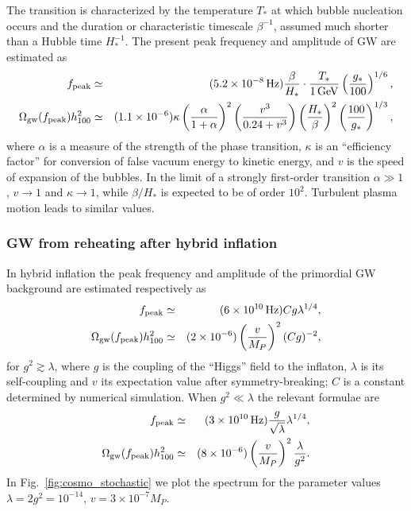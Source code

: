 The transition is characterized by the temperature $T_\ast$ at which bubble nucleation occurs and the duration or characteristic timescale $\beta^{-1}$, assumed much shorter than a Hubble time $H_\ast^{-1}$. The present peak frequency and amplitude of GW are estimated as \cite{Kamionkowski:1993fg}
\begin{eqnarray}
	f_{\rm peak} &\simeq& (5.2\times 10^{-8}\,{\rm Hz}) \frac{\beta}{H_\ast}\cdot \frac{T_\ast}{1\,{\rm GeV}}
	\left(\frac{g_\ast}{100}\right)^{1/6}, \nonumber \\
	\Omega_{\rm gw}(f_{\rm peak})h_{100}^2 &\simeq& (1.1\times 10^{-6}) \kappa
	\left(\frac{\alpha}{1+\alpha}\right)^2 \left(\frac{v^3}{0.24+v^3}\right) \left(\frac{H_\ast}{\beta}\right)^2
	\left(\frac{100}{g_\ast}\right)^{1/3},
\end{eqnarray}
where $\alpha$ is a measure of the strength of the phase transition, $\kappa$ is an ``efficiency factor'' for conversion of false vacuum energy to kinetic energy, and $v$ is the speed of expansion of the bubbles. In the limit of a strongly first-order transition $\alpha\gg 1$, $v\rightarrow 1$ and $\kappa \rightarrow 1$, while $\beta/H_\ast$ is expected to be of order $10^2$. Turbulent plasma motion leads to similar values.

\subsubsection{GW from reheating after hybrid inflation}
\label{box:hybridinf}

In hybrid inflation the peak frequency and amplitude of the primordial GW background are estimated respectively as
\begin{eqnarray}
	f_{\rm peak} &\simeq& (6\times 10^{10}\,{\rm Hz}) C g \lambda^{1/4}, \nonumber \\
	\Omega_{\rm gw}(f_{\rm peak})h_{100}^2 &\simeq& (2\times 10^{-6}) \left(\frac{v}{M_{P}}\right)^2 (Cg)^{-2},
\end{eqnarray}
for $g^2 \gtrsim \lambda$, where $g$ is the coupling of the ``Higgs'' field to the inflaton, $\lambda$ is its self-coupling and $v$ its expectation value after symmetry-breaking; $C$ is a constant determined by numerical simulation. When $g^2 \ll \lambda$ the relevant formulae are
\begin{eqnarray}
	f_{\rm peak} &\simeq& (3\times 10^{10}\,{\rm Hz}) \frac{g}{\sqrt{\lambda}} \lambda^{1/4}, \nonumber \\
	\Omega_{\rm gw}(f_{\rm peak})h_{100}^2 &\simeq& (8\times 10^{-6}) \left(\frac{v}{M_{P}}\right)^2
	\frac{\lambda}{g^2}.
\end{eqnarray}
In Fig.~\ref{fig:cosmo_stochastic} we plot the spectrum for the parameter values $\lambda = 2g^2 = 10^{-14}$, $v = 3\times 10^{-7}M_{P}$.

